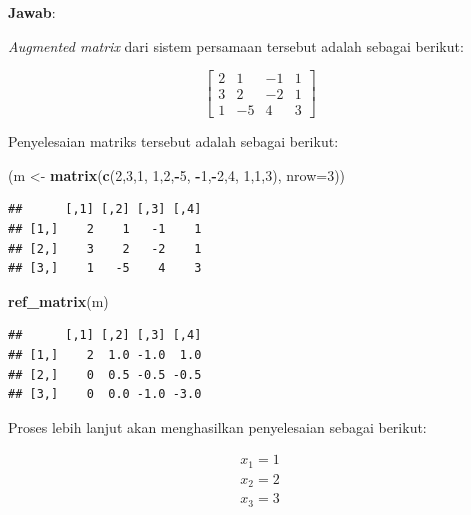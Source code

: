 \documentclass[
]{book}
\newenvironment{Shaded}{\begin{snugshade}}{\end{snugshade}}
\newcommand{\AttributeTok}[1]{\textcolor[rgb]{0.13,0.29,0.53}{#1}}
\newcommand{\DecValTok}[1]{\textcolor[rgb]{0.00,0.00,0.81}{#1}}
\newcommand{\FunctionTok}[1]{\textcolor[rgb]{0.13,0.29,0.53}{\textbf{#1}}}
\newcommand{\NormalTok}[1]{#1}
\newcommand{\OtherTok}[1]{\textcolor[rgb]{0.56,0.35,0.01}{#1}}
\newcommand{\SpecialCharTok}[1]{\textcolor[rgb]{0.81,0.36,0.00}{\textbf{#1}}}
\theoremstyle{definition}
\theoremstyle{definition}
\theoremstyle{definition}
\theoremstyle{definition}
\theoremstyle{remark}
\begin{document}
\textbf{Jawab}:

\emph{Augmented matrix} dari sistem persamaan tersebut adalah sebagai berikut:

\[
\begin{bmatrix}
     2 & 1 & -1 & 1     \\[0.3em]
     3 & 2 & -2 & 1     \\[0.3em]
     1 & -5 & 4 & 3
\end{bmatrix}
\]

Penyelesaian matriks tersebut adalah sebagai berikut:

\begin{Shaded}
\begin{Highlighting}[]
\NormalTok{(m }\OtherTok{\textless{}{-}} \FunctionTok{matrix}\NormalTok{(}\FunctionTok{c}\NormalTok{(}\DecValTok{2}\NormalTok{,}\DecValTok{3}\NormalTok{,}\DecValTok{1}\NormalTok{,}
              \DecValTok{1}\NormalTok{,}\DecValTok{2}\NormalTok{,}\SpecialCharTok{{-}}\DecValTok{5}\NormalTok{,}
              \SpecialCharTok{{-}}\DecValTok{1}\NormalTok{,}\SpecialCharTok{{-}}\DecValTok{2}\NormalTok{,}\DecValTok{4}\NormalTok{,}
              \DecValTok{1}\NormalTok{,}\DecValTok{1}\NormalTok{,}\DecValTok{3}\NormalTok{), }\AttributeTok{nrow=}\DecValTok{3}\NormalTok{))}
\end{Highlighting}
\end{Shaded}

\begin{verbatim}
##      [,1] [,2] [,3] [,4]
## [1,]    2    1   -1    1
## [2,]    3    2   -2    1
## [3,]    1   -5    4    3
\end{verbatim}

\begin{Shaded}
\begin{Highlighting}[]
\FunctionTok{ref\_matrix}\NormalTok{(m)}
\end{Highlighting}
\end{Shaded}

\begin{verbatim}
##      [,1] [,2] [,3] [,4]
## [1,]    2  1.0 -1.0  1.0
## [2,]    0  0.5 -0.5 -0.5
## [3,]    0  0.0 -1.0 -3.0
\end{verbatim}

Proses lebih lanjut akan menghasilkan penyelesaian sebagai berikut:

\[
\begin{matrix}
     x_1=1     \\[0.3em]
     x_2=2     \\[0.3em]
     x_3=3
\end{matrix}
\]
\end{document}
